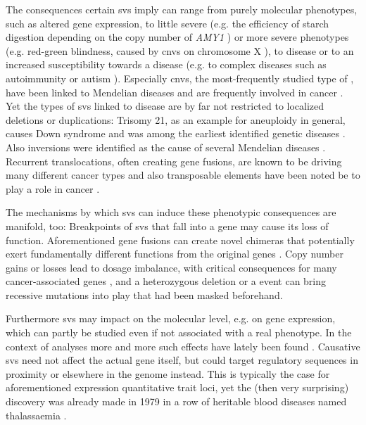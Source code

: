 The consequences certain \acp{sv} imply can range from purely molecular
phenotypes, such as altered gene expression, to little severe (e.g. the efficiency of
starch digestion depending on the copy number of \textit{AMY1} \citep{Perry2007})
or more severe phenotypes (e.g. red-green blindness, caused by \acp{cnv} on
chromosome X \citep{Nathans1986}), to disease or to an increased susceptibility
towards a disease (e.g. to complex diseases such as autoimmunity
\citep{Fanciulli2007} or autism \citep{Sebat2007}). Especially \acp{cnv}, the
most-frequently studied type of \sv, have been linked to Mendelian diseases
\citep[see table 2]{Zhang2009} and are frequently involved in cancer
\citep{Beroukhim2010}. Yet the types of \acp{sv} linked to disease are by far
not restricted to localized deletions or duplications: Trisomy 21, as an example
for aneuploidy in general, causes Down syndrome and was among the earliest
identified genetic diseases \citep{Lejeune1959}. Also inversions were identified
as the cause of several Mendelian diseases \citep{Feuk2010}. Recurrent
translocations, often creating gene fusions, are known to be driving many
different cancer types \citep{Mertens2015} and also transposable elements have
been noted be to play a role in cancer \citep{Burns2017}.

The mechanisms by which \acp{sv} can induce these phenotypic consequences are
manifold, too: Breakpoints of \acp{sv} that fall into a gene may cause its loss
of function. Aforementioned gene fusions can create novel chimeras that
potentially exert fundamentally different functions from the original genes
\citep{Mertens2015}. Copy number gains or losses lead to dosage imbalance, with
critical consequences for many cancer-associated genes \citep{Fehrmann2015}, and
a heterozygous deletion or a \loh event can bring recessive mutations into play
that had been masked beforehand.

Furthermore \acp{sv} may impact on the molecular level, e.g. on gene expression,
which can partly be studied even if not associated with a real phenotype. In
the context of  analyses
more and more such effects have lately been found \citep{Sudmant2015,Chiang2017}.
Causative \acp{sv} need not affect the actual gene itself, but could target
regulatory sequences in proximity or elsewhere in the genome instead. This is
typically the case for aforementioned expression quantitative trait loci, yet
the (then very surprising) discovery was already made in 1979 in a row of
heritable blood diseases named thalassaemia \citep{Fritsch1979}.

